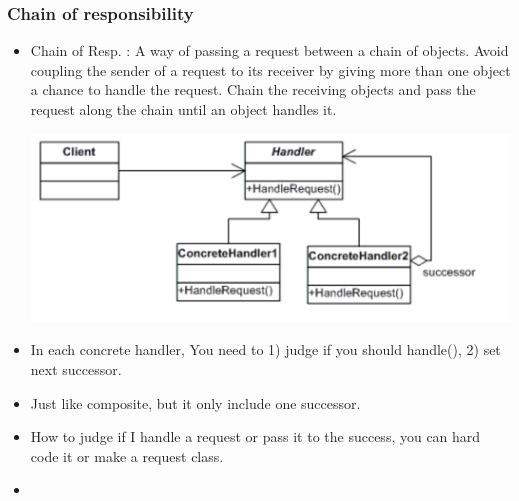 \documentclass[a4paper,12pt,twoside]{book}
\begin{document}
\subsubsection{Chain of responsibility}
\begin{itemize}
\item Chain of Resp. : A way of passing a request between a chain of objects. Avoid coupling the sender of a request to its receiver by giving more than one object a  chance to handle the request. Chain the receiving objects and pass the request along the chain until an object handles it.

\includegraphics[scale=0.8]{pics/chain.png}

\item In each concrete handler, You need to 1) judge if you should handle(), 2) set next successor. 

\item Just like composite, but it only include one successor. 

\item How to judge if I handle a request or pass it to the success, you can hard code it or make a request class. 

\item 
\end{itemize}
\end{document}
